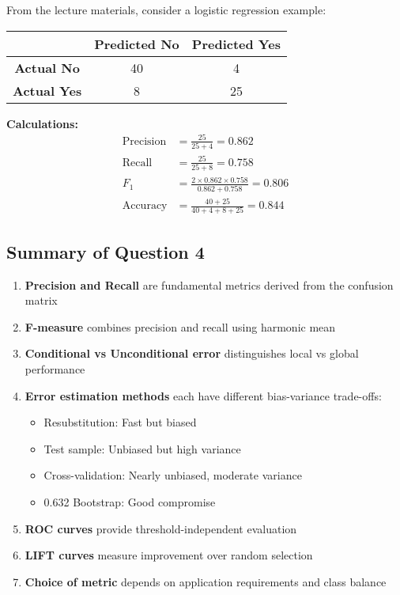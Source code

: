 \documentclass[12pt,a4paper]{article}
\begin{document}
From the lecture materials, consider a logistic regression example:

\begin{table}[h]
\centering
\begin{tabular}{|c|c|c|}
\hline
& \textbf{Predicted No} & \textbf{Predicted Yes} \\
\hline
\textbf{Actual No} & 40 & 4 \\
\hline
\textbf{Actual Yes} & 8 & 25 \\
\hline
\end{tabular}
\end{table}

\textbf{Calculations:}
\begin{align}
\text{Precision} &= \frac{25}{25 + 4} = 0.862 \\
\text{Recall} &= \frac{25}{25 + 8} = 0.758 \\
F_1 &= \frac{2 \times 0.862 \times 0.758}{0.862 + 0.758} = 0.806 \\
\text{Accuracy} &= \frac{40 + 25}{40 + 4 + 8 + 25} = 0.844
\end{align}

\subsection{Summary of Question 4}

\begin{enumerate}
    \item \textbf{Precision and Recall} are fundamental metrics derived from the confusion matrix
    \item \textbf{F-measure} combines precision and recall using harmonic mean
    \item \textbf{Conditional vs Unconditional error} distinguishes local vs global performance
    \item \textbf{Error estimation methods} each have different bias-variance trade-offs:
        \begin{itemize}
            \item Resubstitution: Fast but biased
            \item Test sample: Unbiased but high variance
            \item Cross-validation: Nearly unbiased, moderate variance
            \item 0.632 Bootstrap: Good compromise
        \end{itemize}
    \item \textbf{ROC curves} provide threshold-independent evaluation
    \item \textbf{LIFT curves} measure improvement over random selection
    \item \textbf{Choice of metric} depends on application requirements and class balance
\end{enumerate}
\end{document}
